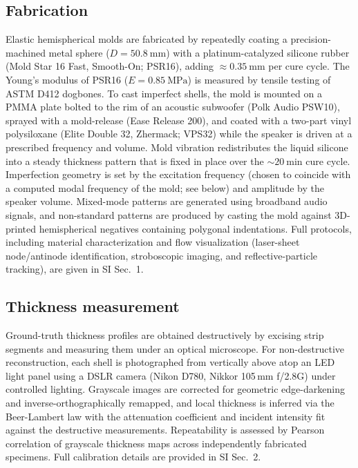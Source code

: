 \documentclass[twocolumn,letter,11pt]{article}
\begin{document}
\subsection*{Fabrication}
Elastic hemispherical molds are fabricated by repeatedly coating a precision-machined metal sphere ($D = \SI{50.8}{\milli\metre}$) with a platinum-catalyzed silicone rubber (Mold Star 16 Fast, Smooth-On; PSR16), adding $\approx \SI{0.35}{\milli\metre}$ per cure cycle. The Young's modulus of PSR16 ($E = \SI{0.85}{\mega\pascal}$) is measured by tensile testing of ASTM D412 dogbones. To cast imperfect shells, the mold is mounted on a PMMA plate bolted to the rim of an acoustic subwoofer (Polk Audio PSW10), sprayed with a mold-release (Ease Release 200), and coated with a two-part vinyl polysiloxane (Elite Double 32, Zhermack; VPS32) while the speaker is driven at a prescribed frequency and volume. Mold vibration redistributes the liquid silicone into a steady thickness pattern that is fixed in place over the $\sim \SI{20}{\minute}$ cure cycle. Imperfection geometry is set by the excitation frequency (chosen to coincide with a computed modal frequency of the mold; see below) and amplitude by the speaker volume. Mixed-mode patterns are generated using broadband audio signals, and non-standard patterns are produced by casting the mold against 3D-printed hemispherical negatives containing polygonal indentations. Full protocols, including material characterization and flow visualization (laser-sheet node/antinode identification, stroboscopic imaging, and reflective-particle tracking), are given in SI Sec.~1.

\subsection*{Thickness measurement}
Ground-truth thickness profiles are obtained destructively by excising strip segments and measuring them under an optical microscope. For non-destructive reconstruction, each shell is photographed from vertically above atop an LED light panel using a DSLR camera (Nikon D780, Nikkor 105\,mm f/2.8G) under controlled lighting. Grayscale images are corrected for geometric edge-darkening and inverse-orthographically remapped, and local thickness is inferred via the Beer-Lambert law with the attenuation coefficient and incident intensity fit against the destructive measurements. Repeatability is assessed by Pearson correlation of grayscale thickness maps across independently fabricated specimens. Full calibration details are provided in SI Sec.~2.
\end{document}
